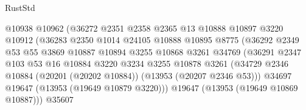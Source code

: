 \begin{lexlean}{RustStd}
\begin{coremodule}
                                      @10938
                                      @10962
                                      (@36272
                                        @2351
                                        @2358
                                        @2365
                                        @13
                                        @10888
                                        @10897
                                        @3220
                                        @10912
                                        (@36283
                                          @2350
                                          @1014
                                          @24105
                                          @10888
                                          @10895
                                          @8775
                                          (@36292
                                            @2349
                                            @53
                                            @55
                                            @3869
                                            @10887
                                            @10894
                                            @3255
                                            @10868
                                            @3261
                                            @34769
                                            (@36291
                                              @2347
                                              @103
                                              @53
                                              @16
                                              @10884
                                              @3220
                                              @3234
                                              @3255
                                              @10878
                                              @3261
                                              (@34729
                                                @2346
                                                @10884
                                                (@20201 (@20202 @10884))
                                                (@13953 (@20207 @2346 @53)))
                                              @34697
                                              @19647
                                              (@13953 (@19649 @10879 @3220)))
                                            @19647
                                            (@13953 (@19649 @10869 @10887)))
                                          @35607

\end{coremodule}
\end{lexlean}

